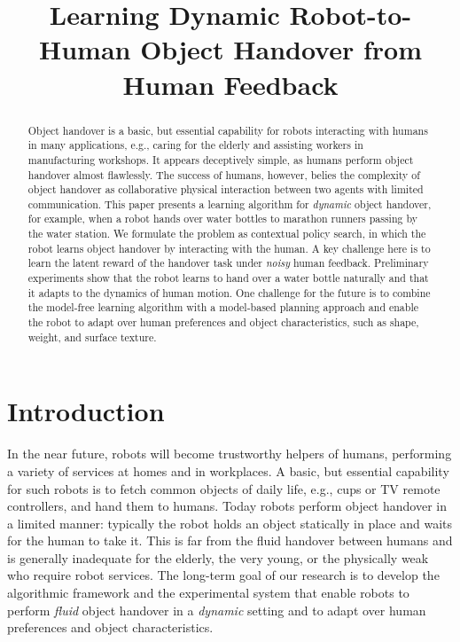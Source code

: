 \title{Learning Dynamic Robot-to-Human Object Handover from Human Feedback}

\begin{abstract}
Object handover is a basic, but essential capability for robots interacting with humans in many applications, e.g., caring for the elderly and assisting workers in manufacturing workshops. It appears deceptively simple, as humans perform object handover almost flawlessly. The success of humans, however, belies the complexity of object handover as collaborative physical interaction between two agents with limited communication. This paper presents a learning algorithm for \emph{dynamic} object handover, for example, when a robot hands over water bottles to marathon runners passing by the water station. We formulate the problem as contextual policy search, in  which the robot learns object handover by interacting with the human. A key challenge here is to learn the latent reward of the handover task under \emph{noisy} human feedback. Preliminary experiments show that the robot learns to hand over a water bottle naturally and that it adapts to the dynamics of human motion. One challenge for the future is to combine the model-free learning algorithm with a model-based planning approach and enable the robot to adapt over human preferences and object characteristics, such as shape, weight, and surface texture.
\end{abstract}

\section{Introduction}

In the near future, robots will become trustworthy helpers of humans, performing a variety of services at homes and in workplaces.  A basic, but essential capability for such robots is to fetch common objects of daily life, e.g., cups or TV remote controllers, and hand them to humans. Today robots perform object handover in a limited manner: typically the robot holds an object statically in place and waits for the human to take it.  This is far from the fluid handover between humans and is generally inadequate for the elderly, the very young, or the physically weak who require robot services.  The long-term goal of our research is to develop the algorithmic framework and the experimental system that  enable robots to perform \emph{fluid} object handover in a \emph{dynamic} setting and to adapt over human preferences and object characteristics.

